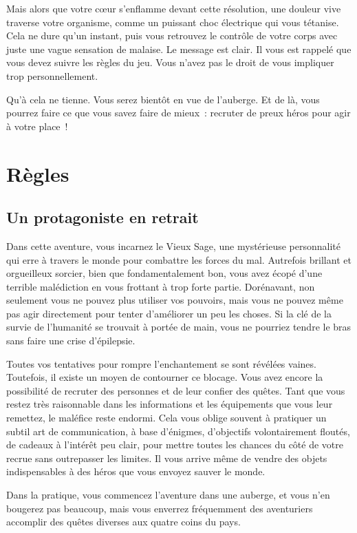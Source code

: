 \documentclass{report}
\begin{document}
Mais alors que votre cœur s'enflamme devant cette résolution, une douleur vive traverse votre organisme, comme un puissant choc électrique qui vous tétanise. Cela ne dure qu'un instant, puis vous retrouvez le contrôle de votre corps avec juste une vague sensation de malaise. Le message est clair. Il vous est rappelé que vous devez suivre les règles du jeu. Vous n'avez pas le droit de vous impliquer trop personnellement.

Qu'à cela ne tienne. Vous serez bientôt en vue de l'auberge. Et de là, vous pourrez faire ce que vous savez faire de mieux : recruter de preux héros pour agir à votre place !

\chapter{Règles}

\section{Un protagoniste en retrait}

Dans cette aventure, vous incarnez le Vieux Sage, une mystérieuse personnalité qui erre à travers le monde pour combattre les forces du mal. Autrefois brillant et orgueilleux sorcier, bien que fondamentalement bon, vous avez écopé d'une terrible malédiction en vous frottant à trop forte partie. Dorénavant, non seulement vous ne pouvez plus utiliser vos pouvoirs, mais vous ne pouvez même pas agir directement pour tenter d'améliorer un peu les choses. Si la clé de la survie de l'humanité se trouvait à portée de main, vous ne pourriez tendre le bras sans faire une crise d'épilepsie.

Toutes vos tentatives pour rompre l'enchantement se sont révélées vaines. Toutefois, il existe un moyen de contourner ce blocage. Vous avez encore la possibilité de recruter des personnes et de leur confier des quêtes. Tant que vous restez très raisonnable dans les informations et les équipements que vous leur remettez, le maléfice reste endormi. Cela vous oblige souvent à pratiquer un subtil art de communication, à base d'énigmes, d'objectifs volontairement floutés, de cadeaux à l'intérêt peu clair, pour mettre toutes les chances du côté de votre recrue sans outrepasser les limites. Il vous arrive même de vendre des objets indispensables à des héros que vous envoyez sauver le monde.

Dans la pratique, vous commencez l'aventure dans une auberge, et vous n'en bougerez pas beaucoup, mais vous enverrez fréquemment des aventuriers accomplir des quêtes diverses aux quatre coins du pays.
\end{document}
